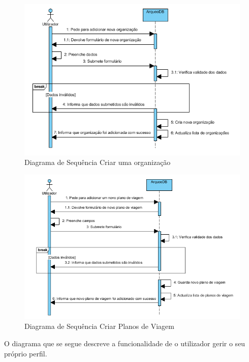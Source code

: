 ﻿\documentclass[12pt,a4paper]{article}
\begin{document}
\begin{figure}[h!]
\centering
\includegraphics[scale=0.8]{sequencia/criarorganizacao}
\caption{Diagrama de Sequência Criar uma organização} 
\end{figure}

\begin{figure}[h!]
\centering
\includegraphics[scale=0.8]{sequencia/criarviagem}
\caption{Diagrama de Sequência Criar Planos de Viagem} 
\end{figure}

\clearpage
O diagrama que se segue descreve a funcionalidade de o utilizador gerir o seu próprio perfil.\\
\end{document}
